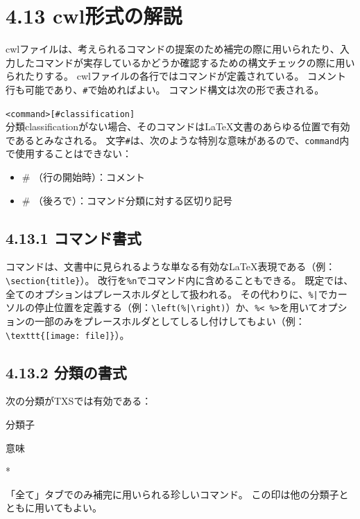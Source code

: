 \documentclass[]{book}
\begin{document}
\section{4.13 cwl形式の解説}

cwlファイルは、考えられるコマンドの提案のため補完の際に用いられたり、入力したコマンドが実存しているかどうか確認するための構文チェックの際に用いられたりする。
cwlファイルの各行ではコマンドが定義されている。
コメント行も可能であり、\lstinline!#!で始めればよい。
コマンド構文は次の形で表される。

\lstinline!<command>[#classification]!\\

分類classificationがない場合、そのコマンドはLaTeX文書のあらゆる位置で有効であるとみなされる。
文字\lstinline!#!は、次のような特別な意味があるので、\lstinline!command!内で使用することはできない：

\begin{itemize}
\item
  \# （行の開始時）：コメント
\item
  \# （後ろで）：コマンド分類に対する区切り記号
\end{itemize}

\subsection{4.13.1 コマンド書式}

コマンドは、文書中に見られるような単なる有効なLaTeX表現である（例：\lstinline!\section{title}!）。
改行を\lstinline!%n!でコマンド内に含めることもできる。
既定では、全てのオプションはプレースホルダとして扱われる。
その代わりに、\lstinline!%|!でカーソルの停止位置を定義する（例：\lstinline!\left(%|\right)!）か、\lstinline!%< %>!を用いてオプションの一部のみをプレースホルダとしてしるし付けしてもよい（例：\lstinline!\texttt{[image: file]}!）。

\subsection{4.13.2 分類の書式}

次の分類がTXSでは有効である：

分類子

意味

*

「全て」タブでのみ補完に用いられる珍しいコマンド。
この印は他の分類子とともに用いてもよい。
\end{document}
